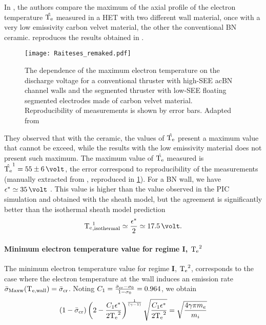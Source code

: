     In \citet{raitses2006}, the authors compare the maximum of the axial profile of the electron temperature $\hat{\mathrm{T_e}}$ measured in a \ac{HET} with two different wall material, once with a very low emissivity carbon velvet material, the other the conventional \ac{BN} ceramic.
     reproduces the results obtained in \citet{raitses2006}.
    
    \begin{figure}[hbtp]
      \centering
      \texttt{[image: Raiteses\_remaked.pdf]}
      \caption{ The dependence of the maximum electron temperature on the discharge  voltage for a conventional thruster with high-SEE ac{BN} channel walls and the segmented thruster with low-SEE floating segmented electrodes made of carbon velvet material. Reproducibility of measurements is shown by error bars. Adapted from \citet[Fig. 3]{raitses2006} }
      \label{fig-raiteses2006}
    \end{figure}
    
    
    They observed that with the ceramic, the values of $\hat{\mathrm{T_e}}$ present a maximum value that cannot be exceed, while the results with the low emissivity material does not present such maximum.
    The maximum value of $\hat{\mathrm{T_e}}$ measured is $\hat{\Te}^1 = 55 \pm 6\,\volt$, the error correspond to reproducibility of the measurements (manually extracted from \citep[Fig. 3]{raitses2006}, reproduced in \cref{fig-raiteses2006}).
    For a \ac{BN} wall, we have $\crover\simeq 35\,\volt$ \citet{smirnov2004}.
    This value is higher than the value observed in the \ac{PIC} simulation and obtained with the sheath model, but the agreement is significantly better than the isothermal sheath model prediction 
    \begin{equation} \label{eq-Temaxisothermal}
      \Te^1_{\rm , isothermal} \simeq \frac{\crover}{2} \simeq 17.5 \,\volt.
    \end{equation}
    
    
    \paragraph{Minimum electron temperature value for regime {\bf I}, $\mathrm{T_e}^2$\\}
    
    The minimum electron temperature value for regime {\bf I}, $\mathrm{T_e}^2$, corresponds to the case where the electron temperature at the wall induces an emission rate $ \bar{\sigma }_{\rm Maxw} (\mathrm{T_{e, wall}}) =  \bar{\sigma }_{\rm cr}$.
    Noting $C_1 = \frac{ \bar{\sigma }_{\rm cr} - \sigma_0}{1-\sigma_0} = 0.964$, we obtain
    \begin{equation} \label{eq-Te2}
      (1- \bar{\sigma }_{\rm cr}) \left( 2 - \frac{C_1 \epsilon^{*}}{2 \mathrm{T_e}^2} \right)^{\frac{1}{(\gamma-1)}} \sqrt{\frac{C_1 \epsilon^{*}}{2 \mathrm{T_e}^2}} = \sqrt{\frac{4 \gamma \pi m_e}{m_i}}
    \end{equation}
    
